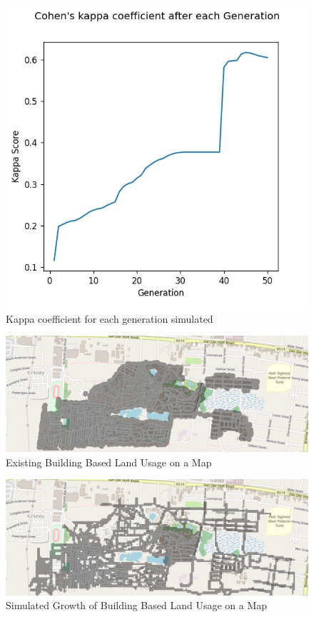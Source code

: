 \begin{figure}[H]
\centering
\includegraphics[scale=0.7]{Figures/Chapter4/scoresFigure}
\caption{Kappa coefficient for each generation simulated}
\end{figure}

\begin{figure}[H]
\centering
\includegraphics[scale=0.3,angle=90]{Figures/Chapter4/Actual}
\caption{Existing Building Based Land Usage on a Map}
\end{figure}

\begin{figure}[H]
\centering
\includegraphics[scale=0.3,angle=90]{Figures/Chapter4/Simulated}
\caption{Simulated Growth of Building Based Land Usage on a Map}
\end{figure}

